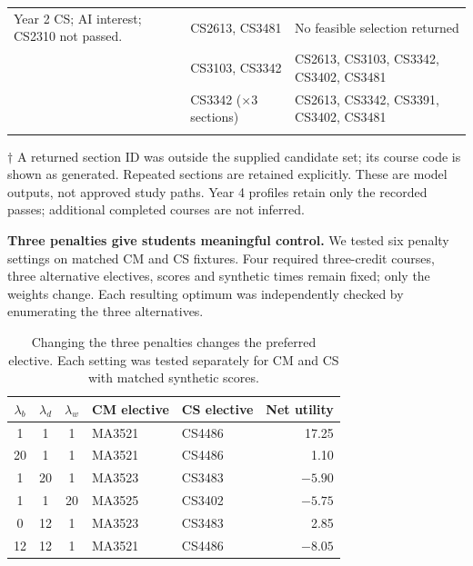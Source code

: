 \documentclass{article}
\begin{document}
{\begin{longtable}{p{1.67in}p{1.75in}p{1.75in}}
{\raggedright Year 2 CS; AI interest; CS2310 not passed.\par} & {\raggedright CS2613, CS3481\par} & {\raggedright No feasible selection returned\par}\\
\addlinespace[2pt]
{\raggedright Year 2 CS; AI interest; higher workload weight ($\lambda_w=20$).\par} & {\raggedright CS3103, CS3342\par} & {\raggedright CS2613, CS3103, CS3342, CS3402, CS3481\par}\\
\addlinespace[2pt]
{\raggedright Year 4 CS; AI interest; unfinished core courses.\par} & {\raggedright CS3342 ($\times3$ sections)\par} & {\raggedright CS2613, CS3342, CS3391, CS3402, CS3481\par}\\
\addlinespace[2pt]
\end{longtable}
}
\noindent\footnotesize $\dagger$ A returned section ID was outside the supplied candidate set; its course code is shown as generated. Repeated sections are retained explicitly. These are model outputs, not approved study paths. Year 4 profiles retain only the recorded passes; additional completed courses are not inferred.\normalsize

\textbf{Three penalties give students meaningful control.} We tested six penalty settings on matched CM and CS fixtures. Four required three-credit courses, three alternative electives, scores and synthetic times remain fixed; only the weights change. Each resulting optimum was independently checked by enumerating the three alternatives.

\begin{table}[H]
\centering\small
\caption{Changing the three penalties changes the preferred elective. Each setting was tested separately for CM and CS with matched synthetic scores.}
\begin{tabular}{cccp{1.05in}p{1.05in}r}
\toprule
$\lambda_b$ & $\lambda_d$ & $\lambda_w$ & CM elective & CS elective & Net utility\\
\midrule
1 & 1 & 1 & MA3521 & CS4486 & 17.25\\
20 & 1 & 1 & MA3521 & CS4486 & 1.10\\
1 & 20 & 1 & MA3523 & CS3483 & $-5.90$\\
1 & 1 & 20 & MA3525 & CS3402 & $-5.75$\\
0 & 12 & 1 & MA3523 & CS3483 & 2.85\\
12 & 12 & 1 & MA3521 & CS4486 & $-8.05$\\
\bottomrule
\end{tabular}
\label{tab:lambda}
\end{table}
\end{document}

